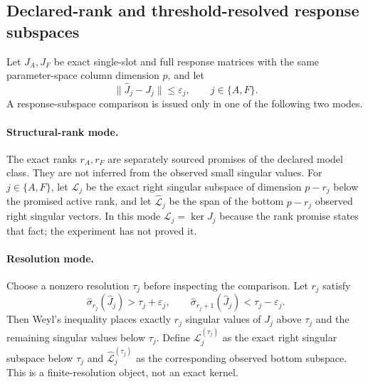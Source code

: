 \documentclass[aps,prl,onecolumn,superscriptaddress,nofootinbib]{revtex4-2}
\newcommand{\eps}{\varepsilon}
\begin{document}
\subsection{Declared-rank and threshold-resolved response subspaces}
\label{sec:resolved-subspaces}

Let $J_A,J_F$ be exact single-slot and full response matrices with the same parameter-space column dimension $p$, and let
\begin{equation}
 \|\widehat J_j-J_j\|\le\eps_j,
 \qquad j\in\{A,F\}.
 \label{eq:J-errors}
\end{equation}
A response-subspace comparison is issued only in one of the following two modes.

\paragraph{Structural-rank mode.}
The exact ranks $r_A,r_F$ are separately sourced promises of the declared model class.  They are not inferred from the observed small singular values.  For $j\in\{A,F\}$, let $\mathcal L_j$ be the exact right singular subspace of dimension $p-r_j$ below the promised active rank, and let $\widehat{\mathcal L}_j$ be the span of the bottom $p-r_j$ observed right singular vectors.  In this mode $\mathcal L_j=\ker J_j$ because the rank promise states that fact; the experiment has not proved it.

\paragraph{Resolution mode.}
Choose a nonzero resolution $\tau_j$ before inspecting the comparison.  Let $r_j$ satisfy
\begin{equation}
 \widehat\sigma_{r_j}(\widehat J_j)>\tau_j+\eps_j,
 \qquad
 \widehat\sigma_{r_j+1}(\widehat J_j)<\tau_j-\eps_j.
 \label{eq:threshold-band}
\end{equation}
Then Weyl's inequality places exactly $r_j$ singular values of $J_j$ above $\tau_j$ and the remaining singular values below $\tau_j$.  Define $\mathcal L_j^{(\tau_j)}$ as the exact right singular subspace below $\tau_j$ and $\widehat{\mathcal L}_j^{(\tau_j)}$ as the corresponding observed bottom subspace.  This is a finite-resolution object, not an exact kernel.
\end{document}
